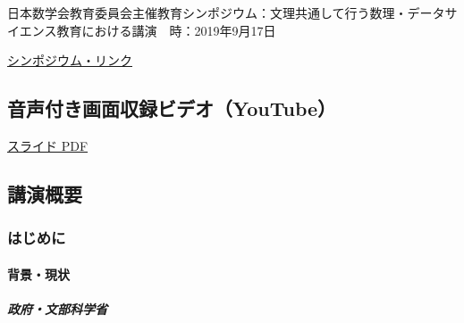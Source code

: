 \documentclass[
]{bxjsbook}
\theoremstyle{definition}
\theoremstyle{definition}
\theoremstyle{definition}
\theoremstyle{definition}
\theoremstyle{remark}
\begin{document}
日本数学会教育委員会主催教育シンポジウム：文理共通して行う数理・データサイエンス教育における講演　時：2019年9月17日

\href{https://www.mathsoc.jp/overview/committee/education/sympo/2019sep.html}{シンポジウム・リンク}

\hypertarget{ux97f3ux58f0ux4ed8ux304dux753bux9762ux53ceux9332ux30d3ux30c7ux30aayoutube}{%
\subsection{音声付き画面収録ビデオ（YouTube）}\label{ux97f3ux58f0ux4ed8ux304dux753bux9762ux53ceux9332ux30d3ux30c7ux30aayoutube}}

\href{https://icu-hsuzuki.github.io/datascience/ed/msj2019.pdf}{スライド PDF}

\hypertarget{ux8b1bux6f14ux6982ux8981}{%
\subsection{講演概要}\label{ux8b1bux6f14ux6982ux8981}}

\hypertarget{ux306fux3058ux3081ux306b-4}{%
\subsubsection{はじめに}\label{ux306fux3058ux3081ux306b-4}}

\hypertarget{ux80ccux666fux73feux72b6}{%
\paragraph{背景・現状}\label{ux80ccux666fux73feux72b6}}

\hypertarget{ux653fux5e9cux6587ux90e8ux79d1ux5b66ux7701}{%
\subparagraph{政府・文部科学省}\label{ux653fux5e9cux6587ux90e8ux79d1ux5b66ux7701}}
\end{document}
